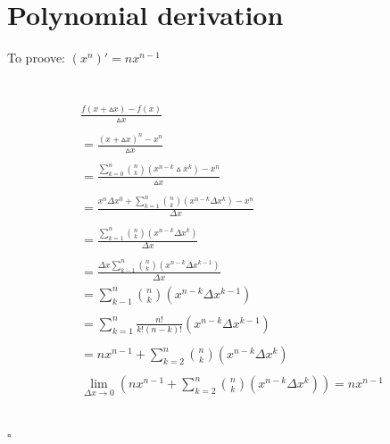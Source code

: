 \documentclass[a4paper]{article}
\begin{document}
\section{Polynomial derivation}
To proove: $(x^n)' = nx^{n-1}$
\\\\\\
\begin{align*}
\frac{f(x+\vartriangle x)-f(x)}{\vartriangle x}
\\\\
=\frac{(x+\vartriangle x)^n-x^n}{\vartriangle x}
\\\\
=\frac{\sum_{k=0}^{n}{n \choose k }(x^{n-k}\vartriangle x^k)-x^n}{\vartriangle x}
\\\\
=\frac{x^n\Delta x^0+\sum_{k=1}^{n}{n \choose k}(x^{n-k}\Delta x^k)-x^n}{\Delta x}
\\\\
=\frac{\sum_{k=1}^{n}{n \choose k}(x^{n-k}\Delta x^k)}{\Delta x}
\\\\
=\frac{\Delta x\sum_{k-1}^{n}{n \choose k}(x^{n-k}\Delta x^{k-1})}{\Delta x}
\\
=\sum_{k-1}^{n}{n \choose k}(x^{n-k}\Delta x^{k-1})
\\\\
=\sum_{k=1}^{n}\frac{n!}{k!(n-k)!}(x^{n-k}\Delta x^{k-1})
\\\\
=nx^{n-1}+\sum_{k=2}^{n}{n \choose k}(x^{n-k}\Delta x^k)
\\\\
\lim_{\Delta x \to 0}\left(nx^{n-1}+\sum_{k=2}^{n}{n \choose k}(x^{n-k}\Delta x^k)\right) = nx^{n-1}
\end{align*}
\\\\
$\square$
\newpage
\end{document}
